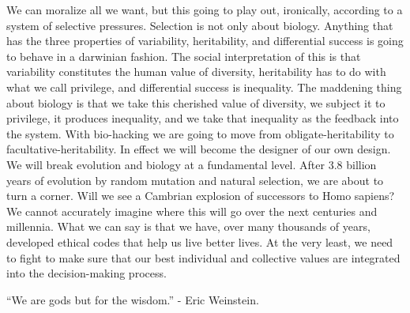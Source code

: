 We can moralize all we want, but this going to play out, ironically, according to a system of selective pressures.
Selection is not only about biology.
Anything that has the three properties of variability, heritability, and differential success is going to behave in a darwinian fashion.
The social interpretation of this is that variability constitutes the human value of diversity, heritability has to do with what we call privilege, and differential success is inequality.
The maddening thing about biology is that we take this cherished value of diversity, we subject it to privilege, it produces inequality, and we take that inequality as the feedback into the system.
With bio-hacking we are going to move from obligate-heritability to facultative-heritability.
In effect we will become the designer of our own design.
We will break evolution and biology at a fundamental level.
After 3.8 billion years of evolution by random mutation and natural selection, we are about to turn a corner.
Will we see a Cambrian explosion of successors to Homo sapiens?
We cannot accurately imagine where this will go over the next centuries and millennia.
What we can say is that we have, over many thousands of years, developed ethical codes that help us live better lives.
At the very least, we need to fight to make sure that our best individual and collective values are integrated into the decision-making process.

\vfill
\hfill ``We are gods but for the wisdom.'' - Eric Weinstein.
